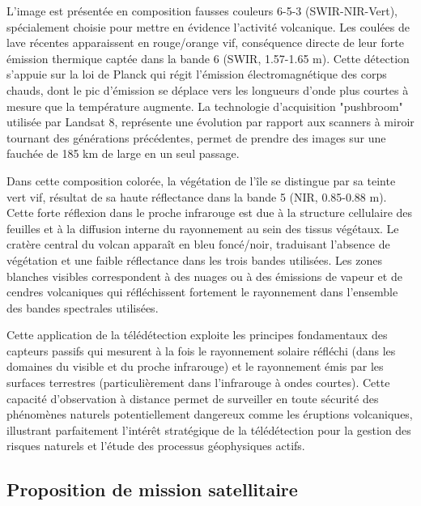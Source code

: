 \documentclass[12pt,a4paper]{article}
\begin{document}
L'image est présentée en composition fausses couleurs 6-5-3 (SWIR-NIR-Vert), spécialement choisie pour mettre en évidence l'activité volcanique. Les coulées de lave récentes apparaissent en rouge/orange vif, conséquence directe de leur forte émission thermique captée dans la bande 6 (SWIR, 1.57-1.65 \textmu m). Cette détection s'appuie sur la loi de Planck qui régit l'émission électromagnétique des corps chauds, dont le pic d'émission se déplace vers les longueurs d'onde plus courtes à mesure que la température augmente. La technologie d'acquisition "pushbroom" utilisée par Landsat 8, représente une évolution par rapport aux scanners à miroir tournant des générations précédentes, permet de prendre des images sur une fauchée de 185 km de large en un seul passage.

Dans cette composition colorée, la végétation de l'île se distingue par sa teinte vert vif, résultat de sa haute réflectance dans la bande 5 (NIR, 0.85-0.88 \textmu m). Cette forte réflexion dans le proche infrarouge est due à la structure cellulaire des feuilles et à la diffusion interne du rayonnement au sein des tissus végétaux. Le cratère central du volcan apparaît en bleu foncé/noir, traduisant l'absence de végétation et une faible réflectance dans les trois bandes utilisées. Les zones blanches visibles correspondent à des nuages ou à des émissions de vapeur et de cendres volcaniques qui réfléchissent fortement le rayonnement dans l'ensemble des bandes spectrales utilisées.

Cette application de la télédétection exploite les principes fondamentaux des capteurs passifs qui mesurent à la fois le rayonnement solaire réfléchi (dans les domaines du visible et du proche infrarouge) et le rayonnement émis par les surfaces terrestres (particulièrement dans l'infrarouge à ondes courtes). Cette capacité d'observation à distance permet de surveiller en toute sécurité des phénomènes naturels potentiellement dangereux comme les éruptions volcaniques, illustrant parfaitement l'intérêt stratégique de la télédétection pour la gestion des risques naturels et l'étude des processus géophysiques actifs.

\subsection{Proposition de mission satellitaire}
\end{document}
